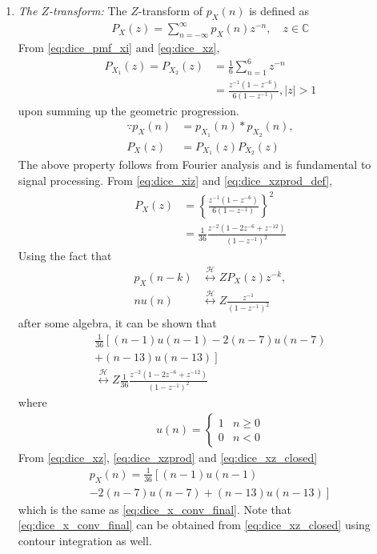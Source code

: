 \documentclass[journal,10pt,twocolumn]{IEEEtran}
\newcounter{Chapcounter}
\numberwithin{equation}{subsection}
\numberwithin{figure}{subsection}
\renewcommand\thesection{\theChapcounter.\arabic{section}}
\providecommand{\lsbrak}[1]{\ensuremath{{}\left[#1\right.}}
\providecommand{\rsbrak}[1]{\ensuremath{{}\left.#1\right]}}
\providecommand{\brak}[1]{\ensuremath{\left(#1\right)}}
\providecommand{\cbrak}[1]{\ensuremath{\left\{#1\right\}}}
\providecommand{\abs}[1]{\left\vert#1\right\vert}
\providecommand{\system}{\overset{\mathcal{H}}{ \longleftrightarrow}}
\renewcommand\thesection{\arabic{section}}
\renewcommand\thesubsection{\thesection.\arabic{subsection}}
\begin{document}
\begin{enumerate}[label=\thesubsection.\arabic*.,ref=\thesubsection.\arabic{figure}]
\item {\em The $Z$-transform: }
The $Z$-transform of $p_X(n)$ is defined as 
\begin{align}
P_X(z) = \sum_{n = -\infty}^{\infty}p_X(n)z^{-n}, \quad z \in \mathbb{C}
\label{eq:dice_xz}
\end{align}
%
From \eqref{eq:dice_pmf_xi} and \eqref{eq:dice_xz}, 
\begin{align}
P_{X_1}(z) =P_{X_2}(z) &= \frac{1}{6}\sum_{n = 1}^{6}z^{-n}
\\
&=\frac{z^{-1}\brak{1-z^{-6}}}{6\brak{1-z^{-1}}},  \abs{z} >1
\label{eq:dice_xiz}
\end{align}
upon summing up the geometric progression.  
\begin{align}
\because p_X(n) &= p_{X_1}(n)*p_{X_2}(n),
\\
P_X(z) &= P_{X_1}(z)P_{X_2}(z)
\label{eq:dice_xzprod_def}
\end{align}
The above property follows from Fourier analysis and is fundamental to signal processing. 
From \eqref{eq:dice_xiz} and \eqref{eq:dice_xzprod_def},
\begin{align}
P_X(z) &= \cbrak{\frac{z^{-1}\brak{1-z^{-6}}}{6\brak{1-z^{-1}}}}^2
\\
&= \frac{1}{36}\frac{z^{-2}\brak{1-2z^{-6}+z^{-12}}}{\brak{1-z^{-1}}^2}
\label{eq:dice_xzprod}
\end{align}
Using the fact that 
\begin{align}
p_X(n-k) &\system{Z}P_X(z)z^{-k},
\\
nu(n)&\system{Z} \frac{z^{-1}}{\brak{1-z^{-1}}^2}
\end{align}
after some algebra, it can be shown that
\begin{multline}
\frac{1}{36}\lsbrak{\brak{n-1}u(n-1) - 2 \brak{n-7}u(n-7)}
\\
\rsbrak{ +\brak{n-13}u(n-13)}
\\
\system{Z}
\frac{1}{36}\frac{z^{-2}\brak{1-2z^{-6}+z^{-12}}}{\brak{1-z^{-1}}^2}
\label{eq:dice_xz_closed}
\end{multline}
where 
\begin{align}
u(n) =
\begin{cases}
1 & n \ge 0
\\
0 & n < 0
\end{cases}
\end{align}
From \eqref{eq:dice_xz}, \eqref{eq:dice_xzprod} and \eqref{eq:dice_xz_closed}
\begin{multline}
p_{X}(n) = \frac{1}{36}\lsbrak{\brak{n-1}u(n-1) 
}
\\
\rsbrak{- 2 \brak{n-7}u(n-7)+\brak{n-13}u(n-13)}
\end{multline}
which is the same as \eqref{eq:dice_x_conv_final}.  Note that  \eqref{eq:dice_x_conv_final} can be obtained from \eqref{eq:dice_xz_closed} using contour integration as well.


\end{enumerate}
\end{document}

